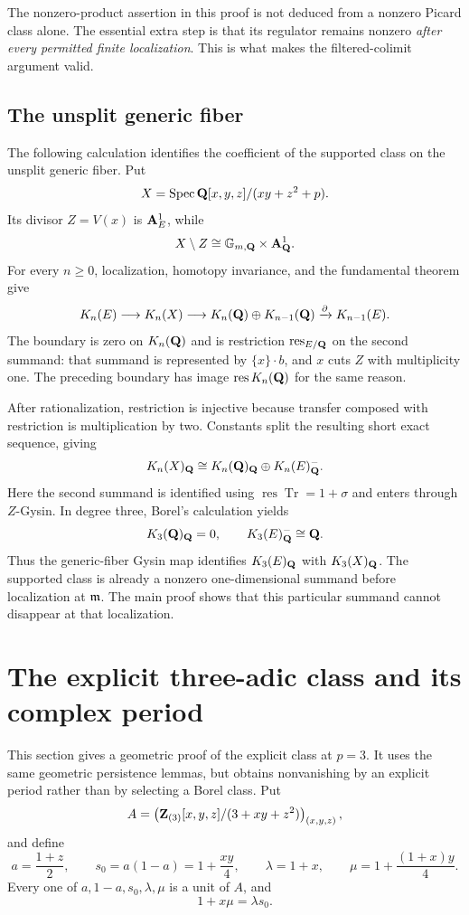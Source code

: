 The nonzero-product assertion in this proof is not deduced from a nonzero Picard class alone. The essential extra step is that its regulator remains nonzero \emph{after every permitted finite localization}. This is what makes the filtered-colimit argument valid.

\subsection{The unsplit generic fiber}

The following calculation identifies the coefficient of the supported class on the unsplit generic fiber. Put
\[
X=\operatorname{Spec}\mathbf Q[x,y,z]/(xy+z^2+p).
\]
Its divisor $Z=V(x)$ is $\mathbf A^1_E$, while
\[
X\setminus Z\cong\mathbb G_{m,\mathbf Q}\times\mathbf A^1_{\mathbf Q}.
\]
For every $n\geq 0$, localization, homotopy invariance, and the fundamental theorem give
\[
K_n(E)\longrightarrow K_n(X)\longrightarrow
K_n(\mathbf Q)\oplus K_{n-1}(\mathbf Q)
\xrightarrow{\partial}K_{n-1}(E).
\]
The boundary is zero on $K_n(\mathbf Q)$ and is restriction $\operatorname{res}_{E/\mathbf Q}$ on the second summand: that summand is represented by $\{x\}\cdot b$, and $x$ cuts $Z$ with multiplicity one. The preceding boundary has image $\operatorname{res}K_n(\mathbf Q)$ for the same reason.

After rationalization, restriction is injective because transfer composed with restriction is multiplication by two. Constants split the resulting short exact sequence, giving
\begin{equation}\label{d3:eq:genericdecomposition}
K_n(X)_{\mathbf Q}\cong K_n(\mathbf Q)_{\mathbf Q}\oplus K_n(E)_{\mathbf Q}^{-}.
\end{equation}
Here the second summand is identified using $\operatorname{res}\operatorname{Tr}=1+\sigma$ and enters through $Z$-Gysin. In degree three, Borel's calculation \cite[Proposition~12.2]{Borel} yields
\[
K_3(\mathbf Q)_{\mathbf Q}=0,\qquad K_3(E)_{\mathbf Q}^{-}\cong\mathbf Q.
\]
Thus the generic-fiber Gysin map identifies $K_3(E)_{\mathbf Q}$ with $K_3(X)_{\mathbf Q}$. The supported class is already a nonzero one-dimensional summand before localization at $\mathfrak m$. The main proof shows that this particular summand cannot disappear at that localization.

\section{The explicit three-adic class and its complex period}\label{d3:sec:explicit}

This section gives a geometric proof of the explicit class at $p=3$. It uses the same geometric persistence lemmas, but obtains nonvanishing by an explicit period rather than by selecting a Borel class. Put
\[
A=\left(\mathbf Z_{(3)}[x,y,z]/(3+xy+z^2)\right)_{(x,y,z)},
\]
and define
\[
a=\frac{1+z}{2},\qquad s_0=a(1-a)=1+\frac{xy}{4},\qquad
\lambda=1+x,\qquad \mu=1+\frac{(1+x)y}{4}.
\]
Every one of $a,1-a,s_0,\lambda,\mu$ is a unit of $A$, and
\begin{equation}\label{d3:eq:unitsidentity}
1+x\mu=\lambda s_0.
\end{equation}

